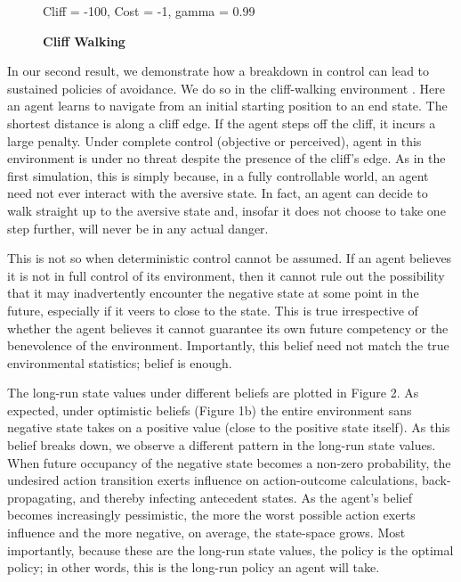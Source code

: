 \documentclass[11pt]{article} %
\begin{document}

\begin{figure}
  \centerline{%
  }
  \caption{\textbf{Cliff Walking}}
  \par Cliff = -100, Cost = -1, gamma = 0.99
\end{figure}

In our second result, we demonstrate how a breakdown in control can lead to
sustained policies of avoidance. We do so in the cliff-walking environment
\citep{SuttonBarto1998, SuttonBarto2018, Gaskett2003}. Here an agent learns to navigate from
an initial starting position to an end state. The shortest distance is along a
cliff edge. If the agent steps off the cliff, it incurs a large penalty. Under
complete control (objective or perceived), agent in this environment is under no
threat despite the presence of the cliff's edge. As in the first simulation, this
is simply because, in a fully controllable world, an agent need not ever interact
with the aversive state. In fact, an agent can decide to walk straight up to the
aversive state and, insofar it does not choose to take one step further, will
never be in any actual danger.

This is not so when deterministic control cannot be assumed. If an agent believes
it is not in full control of its environment, then it cannot rule out the possibility
that it may inadvertently encounter the negative state at some point in the future,
especially if it veers to close to the state. This is true irrespective of whether
the agent believes it cannot guarantee its own future competency or the benevolence
of the environment. Importantly, this belief need not match the true environmental
statistics; belief is enough.

The long-run state values under different beliefs are plotted in Figure 2. As
expected, under optimistic beliefs (Figure 1b) the entire environment sans negative
state takes on a positive value (close to the positive state itself). As this belief
breaks down, we observe a different pattern in the long-run state values. When
future occupancy of the negative state becomes a non-zero probability, the undesired
action transition exerts influence on action-outcome calculations, back-propagating,
and thereby infecting antecedent states. As the agent's belief becomes increasingly
pessimistic, the more the worst possible action exerts influence and the more
negative, on average, the state-space grows. Most importantly, because these are
the long-run state values, the policy is the optimal policy; in other words, this
is the long-run policy an agent will take.
\end{document}
